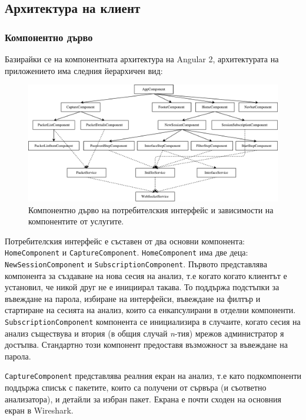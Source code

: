 \documentclass[12pt,a4paper,oneside]{book}
\begin{document}
\subsection{Архитектура на клиент}

\subsubsection{Компонентно дърво}

Базирайки се на компонентната архитектура на Angular 2, архитектурата на
приложението има следния йерархичен вид:

\begin{figure}[h!]
  \centering
  \includegraphics[scale=.5]{figures/ng_component_and_dependencies_tree.pdf}
  \caption{Компонентно дърво на потребителския интерфейс и зависимости на
  компонентите от услугите.}
  \label{ng_component_and_dependencies_tree_fig}
\end{figure}

Потребителския интерфейс е съставен от два основни компонента:
\texttt{HomeComponent} и \texttt{CaptureComponent}. \texttt{HomeComponent}
има две деца: \texttt{NewSessionComponent} и \texttt{SubscriptionComponent}.
Първото представлява компонента за създаване на нова сесия на анализ, т.е когато
когато клиентът е установил, че никой друг не е инициирал такава. То поддържа
подстъпки за въвеждане на парола, избиране на интерфейси, въвеждане на филтър и
стартиране на сесията на анализ, които са енкапсулирани в отделни компоненти.
\texttt{SubscriptionComponent} компонента се инициализира в случаите, когато
сесия на анализ съществува и втория (в общия случай \textit{n}-тия) мрежов администратор
я достъпва. Стандартно този компонент предоставя възможност за въвеждане на
парола.

\texttt{CaptureComponent} представлява реалния екран на анализ, т.е като
подкомпоненти поддържа списък с пакетите, които са получени от сървъра (и
съответно анализатора), и детайли за избран пакет. Екрана е почти сходен на
основния екран в Wireshark.
\end{document}

